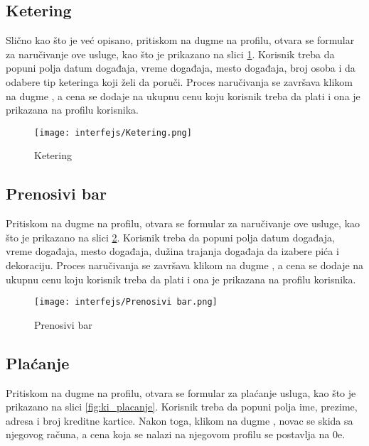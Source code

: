 \documentclass[a4paper]{article}
\begin{document}
\subsection{Ketering}

Slično kao što je već opisano, pritiskom na dugme  na profilu, otvara se formular za naručivanje ove usluge, kao što je prikazano na slici \ref{fig:ki_ketering}. Korisnik treba da popuni polja datum događaja, vreme događaja, mesto događaja, broj osoba i da odabere tip keteringa koji želi da poruči. Proces naručivanja se završava klikom na dugme , a cena se dodaje na ukupnu cenu koju korisnik treba da plati i ona je prikazana na profilu korisnika.  

\begin{figure}[H]
    \centering
    \texttt{[image: interfejs/Ketering.png]}
    \caption{Ketering}
    \label{fig:ki_ketering}
\end{figure}

\subsection{Prenosivi bar}

Pritiskom na dugme  na profilu, otvara se formular za naručivanje ove usluge, kao što je prikazano na slici \ref{fig:ki_prenosivibar}. Korisnik treba da popuni polja datum događaja, vreme događaja, mesto događaja, dužina trajanja događaja da izabere pića i dekoraciju. Proces naručivanja se završava klikom na dugme , a cena se dodaje na ukupnu cenu koju korisnik treba da plati i ona je prikazana na profilu korisnika.  

\begin{figure}[H]
    \centering
    \texttt{[image: interfejs/Prenosivi bar.png]}
    \caption{Prenosivi bar}
    \label{fig:ki_prenosivibar}
\end{figure}

\subsection{Plaćanje}

Pritiskom na dugme  na profilu, otvara se formular za plaćanje usluga, kao što je prikazano na slici \ref{fig:ki_placanje}. Korisnik treba da popuni polja ime, prezime, adresa i broj kreditne kartice. Nakon toga, klikom na dugme , novac se skida sa njegovog računa, a cena koja se nalazi na njegovom profilu se postavlja na 0e.  
\end{document}
